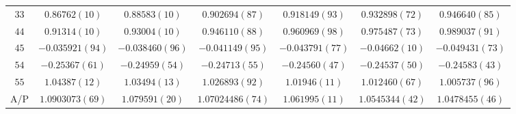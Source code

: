 \begin{table}
\begin{center}
\begin{tabular}{c|c c c c c c}
$33$ & $0.86762(10)$ & $0.88583(10)$ & $0.902694(87)$ & $0.918149(93)$ & $0.932898(72)$ & $0.946640(85)$ \\
$44$ & $0.91314(10)$ & $0.93004(10)$ & $0.946110(88)$ & $0.960969(98)$ & $0.975487(73)$ & $0.989037(91)$ \\
$45$ & $-0.035921(94)$ & $-0.038460(96)$ & $-0.041149(95)$ & $-0.043791(77)$ & $-0.04662(10)$ & $-0.049431(73)$ \\
$54$ & $-0.25367(61)$ & $-0.24959(54)$ & $-0.24713(55)$ & $-0.24560(47)$ & $-0.24537(50)$ & $-0.24583(43)$ \\
$55$ & $1.04387(12)$ & $1.03494(13)$ & $1.026893(92)$ & $1.01946(11)$ & $1.012460(67)$ & $1.005737(96)$ \\
\hline
A/P & $1.0903073(69)$ & $1.079591(20)$ & $1.07024486(74)$ & $1.061995(11)$ & $1.0545344(42)$ & $1.0478455(46)$ \\
\hline
\hline
\end{tabular}
\end{center}
\end{table}